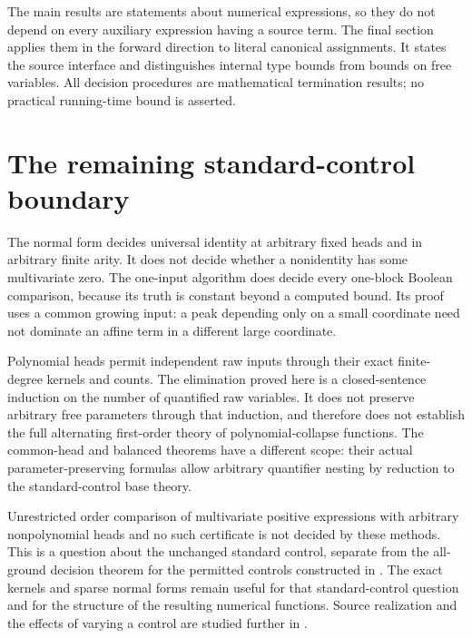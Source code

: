\documentclass[11pt,a4paper]{article}
\theoremstyle{definition}
\theoremstyle{remark}
\numberwithin{equation}{section}
\begin{document}
The main results are statements about numerical expressions, so they do
not depend on every auxiliary expression having a source term.  The final
section applies them in the forward direction to literal canonical
assignments.  It states the source interface and distinguishes internal
type bounds from bounds on free variables.  All decision procedures are
mathematical termination results; no practical running-time bound is
asserted.










\section{The remaining standard-control boundary}

The normal form decides universal identity at arbitrary fixed heads and
in arbitrary finite arity.  It does not decide whether a nonidentity has
some multivariate zero.  The one-input algorithm does decide every
one-block Boolean comparison, because its truth is constant beyond a
computed bound.  Its proof uses a common growing input: a peak depending
only on a small coordinate need not dominate an affine term in a different
large coordinate.

Polynomial heads permit independent raw inputs through their exact
finite-degree kernels and counts.  The elimination proved here is a
closed-sentence induction on the number of quantified raw variables.
It does not preserve arbitrary free parameters through that induction,
and therefore does not establish the full alternating first-order theory
of polynomial-collapse functions.  The common-head and balanced theorems
have a different scope: their actual parameter-preserving formulas allow
arbitrary quantifier nesting by reduction to the standard-control base
theory.

Unrestricted order comparison of multivariate positive expressions with
arbitrary nonpolynomial heads and no such certificate is not decided by
these methods.  This is a question about the unchanged standard control,
separate from the all-ground decision theorem for the permitted controls
constructed in \cite{wwcomparison}.  The exact kernels and sparse
normal forms remain useful for that standard-control question and for
the structure of the resulting numerical functions.  Source realization
and the effects of varying a control are studied further in
\cite{wwsource}.
\end{document}
